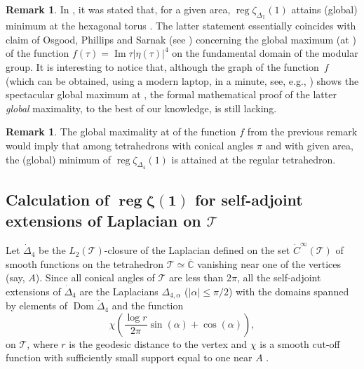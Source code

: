 \documentclass[pdftex]{sigma}
\numberwithin{equation}{section}
\theoremstyle{definition}
\newtheorem{Remark}[Theorem]{Remark}
\begin{document}
\begin{Remark} In \cite{Okikitorus}, it was stated that, for a given area, $\operatorname{reg}\zeta_{\Delta_\mathbb{T}}(1)$ attains (global) minimum at the hexagonal torus . The latter statement essentially coincides with claim of Osgood, Phillips and Sarnak (see \cite[Lemma~4.1 and a numerical evidence given on p.~206]{OPS1})
concerning the global maximum \big(at \big) of the function $f(\tau)= \operatorname{Im} \tau |\eta(\tau)|^4$ on the fundamental domain of the modular group. It is interesting to notice that, although the graph of the function~$f$ (which can be obtained, using a modern laptop, in a minute, see, e.g., \cite[Figure~2, p.~78]{KleinKokKor}) shows the spectacular global maximum at , the formal mathematical proof of the latter {\it global} maximality, to the best of our knowledge, is still lacking.
\end{Remark}

\begin{Remark}
The global maximality at  of the function $f$ from the previous remark would imply that among tetrahedrons with conical angles $\pi$ and with given area, the (global) minimum of $\operatorname{reg}\zeta_{\Delta_4}(1)$ is attained at the regular tetrahedron.
\end{Remark}

\subsection*{Calculation of $\boldsymbol{\operatorname{reg}\zeta(1)}$ for self-adjoint extensions of Laplacian on $\boldsymbol{\mathscr{T}}$}
Let $\dot{\Delta}_4$ be the $L_2(\mathscr{T})$-closure of the Laplacian defined on the set $\dot{C}^{\infty}(\mathscr{T})$ of smooth functions on the tetrahedron $\mathscr{T}\simeq\overline{\mathbb{C}}$ vanishing near one of the vertices (say, $A$). Since all conical angles of $\mathscr{T}$ are less than $2\pi$, all the self-adjoint extensions of $\dot{\Delta}_4$ are the Laplacians $\Delta_{4,\alpha}$ ($|\alpha|\le\pi/2$) with the domains spanned by elements of $\operatorname{Dom}\dot{\Delta}_4$ and the function
\begin{equation}
\label{domain pseudo}
\chi\left(\frac{\log r}{2\pi}\sin(\alpha)+\cos (\alpha)\right),
\end{equation}
on $\mathscr{T}$, where $r$ is the geodesic distance to the vertex and $\chi$ is a smooth cut-off function with sufficiently small support equal to one near $A$ \cite{HK,KL}.
\end{document}
